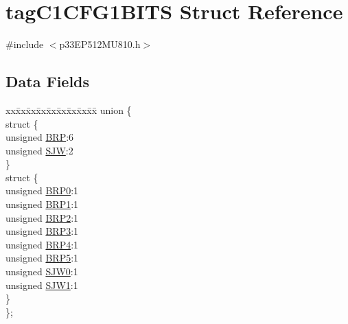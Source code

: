 \hypertarget{structtag_c1_c_f_g1_b_i_t_s}{}\section{tag\+C1\+C\+F\+G1\+B\+I\+TS Struct Reference}
\label{structtag_c1_c_f_g1_b_i_t_s}


{\ttfamily \#include $<$p33\+E\+P512\+M\+U810.\+h$>$}

\subsection*{Data Fields}
\begin{DoxyCompactItemize}
\item 
\begin{tabbing}
xx\=xx\=xx\=xx\=xx\=xx\=xx\=xx\=xx\=\kill
union \{\\
\>struct \{\\
\>\>unsigned \hyperlink{structtag_c1_c_f_g1_b_i_t_s_ae58f97af55d2926c7604071c03cce2ea}{BRP}:6\\
\>\>unsigned \hyperlink{structtag_c1_c_f_g1_b_i_t_s_a4b6f11475d67f4b0cf215740ab306f27}{SJW}:2\\
\>\} \\
\>struct \{\\
\>\>unsigned \hyperlink{structtag_c1_c_f_g1_b_i_t_s_a2dc1817d479cb567ab68ce63a6170412}{BRP0}:1\\
\>\>unsigned \hyperlink{structtag_c1_c_f_g1_b_i_t_s_a1d13a4c74d060baa6d652658b10155a8}{BRP1}:1\\
\>\>unsigned \hyperlink{structtag_c1_c_f_g1_b_i_t_s_a6ccc44a273a42657d5adb296952b3a8b}{BRP2}:1\\
\>\>unsigned \hyperlink{structtag_c1_c_f_g1_b_i_t_s_a84e071832be010fbf9ccbb2fe7ab4631}{BRP3}:1\\
\>\>unsigned \hyperlink{structtag_c1_c_f_g1_b_i_t_s_abb197803ec15b7aee5bb7b69bd5f0ba0}{BRP4}:1\\
\>\>unsigned \hyperlink{structtag_c1_c_f_g1_b_i_t_s_a25c0a19dc5bf39bfc514755041ea75af}{BRP5}:1\\
\>\>unsigned \hyperlink{structtag_c1_c_f_g1_b_i_t_s_aaaa0b320d074d30cd5474f898d0da8fd}{SJW0}:1\\
\>\>unsigned \hyperlink{structtag_c1_c_f_g1_b_i_t_s_abc759fdb4e9ca521d97602fb988fde8f}{SJW1}:1\\
\>\} \\
\}; \\

\end{tabbing}\end{DoxyCompactItemize}


